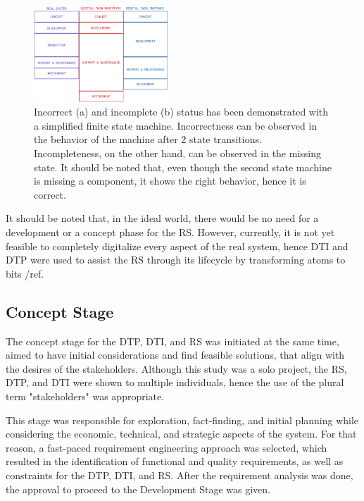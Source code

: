 \documentclass[conference]{IEEEtran}
\begin{document}
    \begin{figure}[htbp]
        \centering
        \includegraphics[width=0.45\textwidth]{LIFECYCLE.png}
        \caption{Incorrect (a) and incomplete (b) status has been demonstrated with a simplified finite state machine. Incorrectness can be observed in the behavior 
        of the machine after 2 state transitions. Incompleteness, on the other hand, can be observed in the missing state. It should be noted that, even though the second state machine is missing a 
        component, it shows the right behavior, hence it is correct.}\label{fig:LIFECYCLE}
    \end{figure}
    
    It should be noted that, in the ideal world, there would be no need for a development or a concept phase for the RS. However, currently, it is not yet feasible to completely digitalize every aspect of the real system,
    hence  DTI and DTP were used to assist the RS through its lifecycle by transforming atoms to bits /ref.

    \subsection{Concept Stage}
    The concept stage for the DTP, DTI, and RS was initiated at the same time, aimed to have initial considerations and find feasible solutions, that align with the desires of the stakeholders. Although this study was a solo project, the RS, DTP, and DTI were shown to multiple individuals, hence the use of the plural term "stakeholders" was appropriate. 

    This stage was responsible for exploration, fact-finding, and initial planning while considering the economic, technical, and strategic aspects of the system. For that reason, a fast-paced requirement 
    engineering approach was selected, which resulted in the identification of functional and quality requirements, as well as constraints for the DTP, DTI, and RS.  
    After the requirement analysis was done, the approval to proceed to the Development Stage was given. 
    
\end{document}

